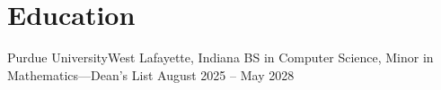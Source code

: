 \section{Education}
  \resumeSubHeadingListStart
    \resumeSubheading
      {Purdue University}{West Lafayette, Indiana}
      {BS in Computer Science, Minor in Mathematics---Dean's List} {August 2025 -- May 2028}
  \resumeSubHeadingListEnd
